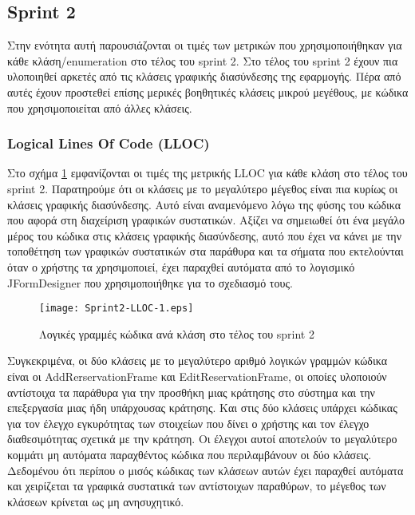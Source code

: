 \subsection{Sprint 2}

Στην ενότητα αυτή παρουσιάζονται οι τιμές των μετρικών που
χρησιμοποιήθηκαν για κάθε κλάση/enumeration στο τέλος του sprint 2. Στο
τέλος του sprint 2 έχουν πια υλοποιηθεί αρκετές από τις κλάσεις γραφικής
διασύνδεσης της εφαρμογής. Πέρα από αυτές έχουν προστεθεί επίσης μερικές
βοηθητικές κλάσεις μικρού μεγέθους, με κώδικα που χρησιμοποιείται από
άλλες κλάσεις.

\subsubsection{Logical Lines Of Code (LLOC)}
\label{section:sprint2LLOC}

Στο σχήμα \ref{fig:sprint2LLOC} εμφανίζονται οι τιμές της μετρικής LLOC
για κάθε κλάση στο τέλος του sprint 2. Παρατηρούμε ότι οι κλάσεις με το
μεγαλύτερο μέγεθος είναι πια κυρίως οι κλάσεις γραφικής διασύνδεσης.
Αυτό είναι αναμενόμενο λόγω της φύσης του κώδικα που αφορά στη
διαχείριση γραφικών συστατικών. Αξίζει να σημειωθεί ότι ένα μεγάλο μέρος
του κώδικα στις κλάσεις γραφικής διασύνδεσης, αυτό που έχει να κάνει με
την τοποθέτηση των γραφικών συστατικών στα παράθυρα και τα σήματα που
εκτελούνται όταν ο χρήστης τα χρησιμοποιεί, έχει παραχθεί αυτόματα από
το λογισμικό JFormDesigner \cite{JFORMDESIGNER} που χρησιμοποιήθηκε για
το σχεδιασμό τους.

\begin{figure}
\centering
\texttt{[image: Sprint2-LLOC-1.eps]}
\caption{Λογικές γραμμές κώδικα ανά κλάση στο τέλος του sprint 2}
\label{fig:sprint2LLOC}
\end{figure}

Συγκεκριμένα, οι δύο κλάσεις με το μεγαλύτερο αριθμό λογικών γραμμών
κώδικα είναι οι AddRerservationFrame και EditReservationFrame, οι οποίες
υλοποιούν αντίστοιχα τα παράθυρα για την προσθήκη μιας κράτησης στο
σύστημα και την επεξεργασία μιας ήδη υπάρχουσας κράτησης. Και στις δύο
κλάσεις υπάρχει κώδικας για τον έλεγχο εγκυρότητας των στοιχείων που
δίνει ο χρήστης και τον έλεγχο διαθεσιμότητας σχετικά με την κράτηση. Οι
έλεγχοι αυτοί αποτελούν το μεγαλύτερο κομμάτι μη αυτόματα παραχθέντος
κώδικα που περιλαμβάνουν οι δύο κλάσεις. Δεδομένου ότι περίπου ο μισός
κώδικας των κλάσεων αυτών έχει παραχθεί αυτόματα και χειρίζεται τα
γραφικά συστατικά των αντίστοιχων παραθύρων, το μέγεθος των κλάσεων
κρίνεται ως μη ανησυχητικό.

